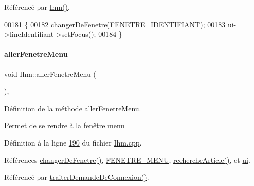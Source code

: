 Référencé par \hyperlink{_ihm_8cpp_source_l00029}{Ihm()}.


\begin{DoxyCode}
00181 \{
00182     \hyperlink{class_ihm_ab33d5d0a85d60a8d41bae11c34435d50}{changerDeFenetre}(\hyperlink{_ihm_8h_a280ed5a4ea1cf0cd4c224443fa33db12ab4af46727ba2f30a07d0dbf72fe1c6f5}{FENETRE\_IDENTIFIANT});
00183     \hyperlink{class_ihm_a0ac5f47856566ceeeca1720109bf70ea}{ui}->lineIdentifiant->setFocus();
00184 \}
\end{DoxyCode}
\mbox{\label{class_ihm_ad158f31ff15add856dfae37a5f40da27}} 
\paragraph{\texorpdfstring{aller\+Fenetre\+Menu}{allerFenetreMenu}}
{\footnotesize\ttfamily void Ihm\+::aller\+Fenetre\+Menu (\begin{DoxyParamCaption}{ }\end{DoxyParamCaption})\hspace{0.3cm}{\ttfamily [private]}, {\ttfamily [slot]}}



Définition de la méthode aller\+Fenetre\+Menu. 

Permet de se rendre à la fenêtre menu 

Définition à la ligne \hyperlink{_ihm_8cpp_source_l00190}{190} du fichier \hyperlink{_ihm_8cpp_source}{Ihm.\+cpp}.



Références \hyperlink{_ihm_8cpp_source_l00077}{changer\+De\+Fenetre()}, \hyperlink{_ihm_8h_source_l00028}{F\+E\+N\+E\+T\+R\+E\+\_\+\+M\+E\+NU}, \hyperlink{class_ihm_a3805ec42b0de42e9210b9561b08f3ecd}{recherche\+Article()}, et \hyperlink{_ihm_8h_source_l00099}{ui}.



Référencé par \hyperlink{_ihm_8cpp_source_l00228}{traiter\+Demande\+De\+Connexion()}.


